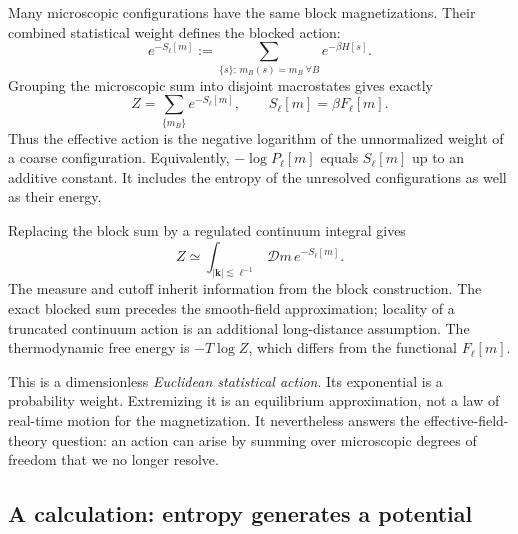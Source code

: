 \documentclass[11pt]{article}
\begin{document}
Many microscopic configurations have the same block magnetizations.
Their combined statistical weight defines the blocked action:
\begin{equation}
\boxed{e^{-S_\ell[m]}
:=\sum_{\{s\}:\,m_B(s)=m_B\ \forall B} e^{-\beta H[s]}.}
\label{eq:effectiveF}
\end{equation}
Grouping the microscopic sum into disjoint macrostates gives exactly
\begin{equation}
Z=\sum_{\{m_B\}}e^{-S_\ell[m]},\qquad
S_\ell[m]=\beta F_\ell[m].
\label{eq:blockedZ}
\end{equation}
Thus the effective action is the negative logarithm of the unnormalized
weight of a coarse configuration. Equivalently, \(-\log P_\ell[m]\)
equals \(S_\ell[m]\) up to an additive constant. It includes the entropy
of the unresolved configurations as well as their energy.

Replacing the block sum by a regulated continuum integral gives
\begin{equation}
Z\simeq\int_{|\bm k|\lesssim\ell^{-1}}\mathcal Dm\,e^{-S_\ell[m]}.
\label{eq:statIntegral}
\end{equation}
The measure and cutoff inherit information from the block construction.
The exact blocked sum precedes the smooth-field approximation; locality
of a truncated continuum action is an additional long-distance assumption.
The thermodynamic free energy is \(-T\log Z\), which differs from the
functional \(F_\ell[m]\).

\begin{remarkbox}
This is a dimensionless \emph{Euclidean statistical action}. Its exponential
is a probability weight. Extremizing it is an equilibrium approximation,
not a law of real-time motion for the magnetization. It nevertheless
answers the effective-field-theory question: an action can arise by
summing over microscopic degrees of freedom that we no longer resolve.
\end{remarkbox}

\subsection{A calculation: entropy generates a potential}
\end{document}
